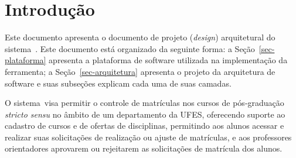 \chapter{Introdução}
\label{sec-intro}

Este documento apresenta o documento de projeto (\textit{design}) arquitetural do sistema~\imprimirtitulo. Este documento está organizado da seguinte forma: a Seção~\ref{sec-plataforma} apresenta a plataforma de software utilizada na implementação da ferramenta; a Seção~\ref{sec-arquitetura} apresenta o projeto da arquitetura de software e suas subseções explicam cada uma de suas camadas.

O sistema~\imprimirtitulo visa permitir o controle de matrículas nos cursos de pós-graduação \textit{stricto sensu} no âmbito de um departamento da UFES, oferecendo suporte ao cadastro de cursos e de ofertas de disciplinas, permitindo aos alunos acessar e realizar suas solicitações de realização ou ajuste de matrículas, e aos professores orientadores aprovarem ou rejeitarem as solicitações de matrícula dos alunos.

